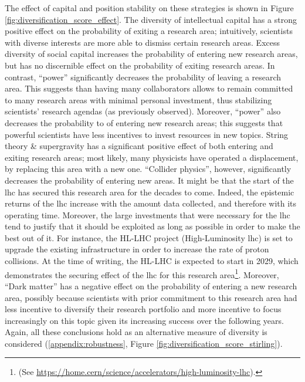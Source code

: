 \documentclass{article}
\begin{document}
The effect of capital and position stability on these strategies is shown in Figure \ref{fig:diversification_score_effect}. The diversity of intellectual capital has a strong positive effect on the probability of exiting a research area; intuitively, scientists with diverse interests are more able to dismiss certain research areas. Excess diversity of social capital increases the probability of entering new research areas, but has no discernible effect on the probability of exiting research areas. In contrast, ``power'' significantly decreases the probability of leaving a research area. This suggests than having many collaborators allows to remain committed to many research areas with minimal personal investment, thus stabilizing scientists' research agendas (as previously observed). Moreover, ``power'' also decreases the probability to of entering new research areas; this suggests that powerful scientists have less incentives to invest resources in new topics. String theory \& supergravity has a significant positive effect of both entering and exiting research areas; most likely, many physicists have operated a displacement, by replacing this area with a new one. ``Collider physics'', however, significantly decreases the probability of entering new areas. It might be that the start of the \gls{lhc} has secured this research area for the decades to come. Indeed, the epistemic returns of the \gls{lhc} increase with the amount data collected, and therefore with its operating time. Moreover, the large investments that were necessary for the \gls{lhc} tend to justify that it should be exploited as long as possible in order to make the best out of it. For instance, the HL-LHC project (High-Luminosity \gls{lhc}) is set to upgrade the existing infrastructure in order to increase the rate of proton collisions. At the time of writing, the HL-LHC is expected to start in 2029, which demonstrates the securing effect of the \gls{lhc} for this research area\footnote{(See \url{https://home.cern/science/accelerators/high-luminosity-lhc}).}. Moreover, ``Dark matter'' has a negative effect on the probability of entering a new research area, possibly because scientists with prior commitment to this research area had less incentive to diversify their research portfolio and more incentive to focus increasingly on this topic given its increasing success over the following years. Again, all these conclusions hold as an alternative measure of diversity is considered (\ref{appendix:robustness}, Figure \ref{fig:diversification_score_stirling}).
 
\end{document}
